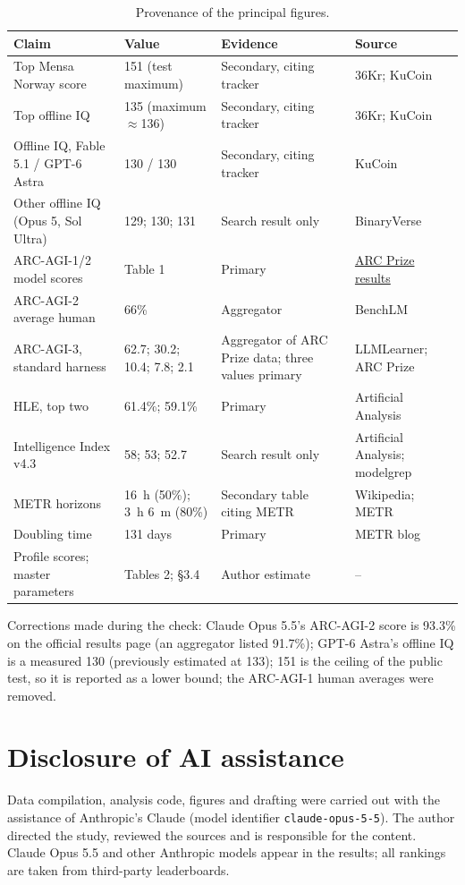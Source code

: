 \documentclass[11pt]{article}
\begin{document}
\begin{table}[htbp]
\centering\small
\caption{Provenance of the principal figures.}
\begin{tabular}{@{}p{4.6cm}p{3.5cm}p{3.1cm}p{3.2cm}@{}}
\toprule
Claim & Value & Evidence & Source \\
\midrule
Top Mensa Norway score & 151 (test maximum) & Secondary, citing tracker & 36Kr; KuCoin \\
Top offline IQ & 135 (maximum $\approx$136) & Secondary, citing tracker & 36Kr; KuCoin \\
Offline IQ, Fable 5.1 / GPT-6 Astra & 130 / 130 & Secondary, citing tracker & KuCoin \\
Other offline IQ (Opus 5, Sol Ultra) & 129; 130; 131 & Search result only & BinaryVerse \\
ARC-AGI-1/2 model scores & Table 1 & Primary & \href{https://arcprize.org/results}{ARC Prize results} \\
ARC-AGI-2 average human & 66\% & Aggregator & BenchLM \\
ARC-AGI-3, standard harness & 62.7; 30.2; 10.4; 7.8; 2.1 & Aggregator of ARC Prize data; three values primary & LLMLearner; ARC Prize \\
HLE, top two & 61.4\%; 59.1\% & Primary & Artificial Analysis \\
Intelligence Index v4.3 & 58; 53; 52.7 & Search result only & Artificial Analysis; modelgrep \\
METR horizons & 16~h (50\%); 3~h 6~m (80\%) & Secondary table citing METR & Wikipedia; METR \\
Doubling time & 131 days & Primary & METR blog \\
Profile scores; master parameters & Tables 2; \S3.4 & Author estimate & -- \\
\bottomrule
\end{tabular}
\end{table}

Corrections made during the check: Claude Opus 5.5's ARC-AGI-2 score is 93.3\% on the official results page (an aggregator listed 91.7\%); GPT-6 Astra's offline IQ is a measured 130 (previously estimated at 133); 151 is the ceiling of the public test, so it is reported as a lower bound; the ARC-AGI-1 human averages were removed.

\section*{Disclosure of AI assistance}
Data compilation, analysis code, figures and drafting were carried out with the assistance of Anthropic's Claude (model identifier \texttt{claude-opus-5-5}). The author directed the study, reviewed the sources and is responsible for the content. Claude Opus 5.5 and other Anthropic models appear in the results; all rankings are taken from third-party leaderboards.
\end{document}
